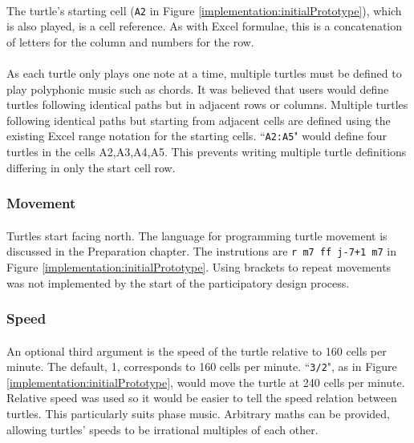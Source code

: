 \paragraph{} The turtle's starting cell (\texttt{A2} in Figure \ref{implementation:initialPrototype}), which is also played, is a cell reference. As with Excel formulae, this is a concatenation of letters for the column and numbers for the row.

\paragraph{} As each turtle only plays one note at a time, multiple turtles must be defined to play polyphonic music such as chords. It was believed that users would define turtles following identical paths but in adjacent rows or columns. Multiple turtles following identical paths but starting from adjacent cells are defined using the existing Excel range notation for the starting cells. ``\texttt{A2:A5}" would define four turtles in the cells A2,A3,A4,A5. This prevents writing multiple turtle definitions differing in only the start cell row.

\vspace{-5pt}
\subsubsection{Movement}

\paragraph{} Turtles start facing north. The language for programming turtle movement is discussed in the Preparation chapter. The instrutions are \texttt{r m7 ff j-7+1 m7} in Figure \ref{implementation:initialPrototype}. Using brackets to repeat movements was not implemented by the start of the participatory design process.

\vspace{-5pt}
\subsubsection{Speed}

\paragraph{} An optional third argument is the speed of the turtle relative to 160 cells per minute. The default, 1, corresponds to 160 cells per minute. ``\texttt{3/2}", as in Figure \ref{implementation:initialPrototype}, would move the turtle at 240 cells per minute. Relative speed was used so it would be easier to tell the speed relation between turtles. This particularly suits phase music. Arbitrary maths can be provided, allowing turtles' speeds to be irrational multiples of each other.

